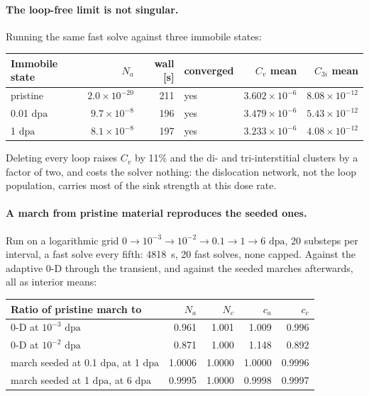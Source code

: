 \documentclass[11pt,a4paper]{article}
\newcommand{\dpa}{\ensuremath{\mathrm{dpa}}}
\begin{document}
\paragraph{The loop-free limit is not singular.} Running the same fast solve
against three immobile states:

\begin{center}
\begin{tabular}{lrrlrr}
\toprule
Immobile state & $N_a$ & wall [s] & converged & $C_v$ mean & $C_{3i}$ mean \\
\midrule
pristine  & $2.0\times10^{-20}$ & 211 & yes & $3.602\times10^{-6}$ & $8.08\times10^{-12}$ \\
0.01 \dpa & $9.7\times10^{-8}$  & 196 & yes & $3.479\times10^{-6}$ & $5.43\times10^{-12}$ \\
1 \dpa    & $8.1\times10^{-8}$  & 197 & yes & $3.233\times10^{-6}$ & $4.08\times10^{-12}$ \\
\bottomrule
\end{tabular}
\end{center}

\noindent
Deleting every loop raises $C_v$ by 11\% and the di- and tri-interstitial
clusters by a factor of two, and costs the solver nothing: the dislocation
network, not the loop population, carries most of the sink strength at this dose
rate.

\paragraph{A march from pristine material reproduces the seeded ones.} Run on a
logarithmic grid $0 \to 10^{-3} \to 10^{-2} \to 0.1 \to 1 \to 6$ \dpa, 20
substeps per interval, a fast solve every fifth: 4818~s, 20 fast solves, none
capped. Against the adaptive 0-D through the transient, and against the seeded
marches afterwards, all as interior means:

\begin{center}
\begin{tabular}{lrrrr}
\toprule
Ratio of pristine march to & $N_a$ & $N_c$ & $c_a$ & $c_c$ \\
\midrule
0-D at $10^{-3}$ \dpa            & 0.961 & 1.001 & 1.009 & 0.996 \\
0-D at $10^{-2}$ \dpa            & 0.871 & 1.000 & 1.148 & 0.892 \\
march seeded at 0.1 \dpa, at 1 \dpa & 1.0006 & 1.0000 & 1.0000 & 0.9996 \\
march seeded at 1 \dpa, at 6 \dpa   & 0.9995 & 1.0000 & 0.9998 & 0.9997 \\
\bottomrule
\end{tabular}
\end{center}
\end{document}
